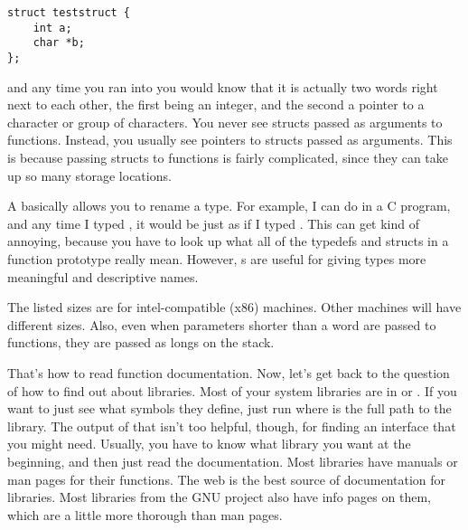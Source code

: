 \begin{description}
\begin{simpletyping}
\begin{lstlisting}
struct teststruct {
	int a;
	char *b;
};
\end{lstlisting}
\end{simpletyping}

and any time you ran into  you
would know that it is actually two words right next to each other,
the first being an integer, and the second a pointer to a character
or group of characters.  You never see structs passed
as arguments to functions.  Instead, you usually see pointers to 
structs passed as arguments.  This is because passing structs to functions
is fairly complicated, since they can take up so many storage locations.
\item[\icode{typedef\index{typedef}}] A  basically allows you to rename a type.  For example, I can
do  in a C program, and 
any time I typed , it would be just
as if I typed .  This can get kind of
annoying, because you have to look up what all of the typedefs and
structs in a function prototype really mean.  However, s
are useful for giving types more meaningful and descriptive names.
\end{description}

\begin{sidebar}
The listed sizes are for intel-compatible (x86) machines.  Other machines will
have different sizes.  Also, even when parameters shorter than a word are
passed to functions, they are passed as longs on the stack.
\end{sidebar}

That's how to read function documentation.  Now, let's get back to the 
question of how to find out about libraries.
Most of your system libraries are in 
or .  If you want to just see what symbols they
define, just run  where 
 is the full path to the library.  The output
of that isn't too helpful, though, for finding an interface that you might
need.  Usually, you have to know what 
library you want at the beginning, and then just read the documentation.
Most libraries have manuals or man pages for their functions.  The web is the
best source of documentation for libraries.  Most libraries from
the GNU project also have info pages on them, which are a little more
thorough than man pages.


